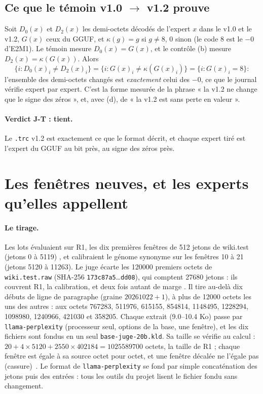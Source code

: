 \subsection{Ce que le témoin v1.0 \texorpdfstring{$\to$}{->} v1.2 prouve}\label{t3jug:sec:temoin}

Soit $D_0(x)$ et $D_2(x)$ les demi-octets décodés de l'expert $x$ dans le v1.0 et le v1.2, $G(x)$ ceux du GGUF, et $\kappa(g) = g$ si $g \ne 8$, $0$ sinon (le code 8 est le $-0$ d'E2M1). Le témoin mesure $D_0(x) = G(x)$, et le contrôle (b) mesure $D_2(x) = \kappa(G(x))$. Alors
\[
\{ i : D_0(x)_i \ne D_2(x)_i \} = \{ i : G(x)_i \ne \kappa(G(x)_i) \} = \{ i : G(x)_i = 8 \} :
\]
l'ensemble des demi-octets changés est \emph{exactement} celui des $-0$, ce que le journal vérifie expert par expert. C'est la forme mesurée de la phrase « la v1.2 ne change que le signe des zéros », et, avec (d), de « la v1.2 est sans perte en valeur ».

\paragraph{Verdict J-T : tient.} Le \texttt{.trc} v1.2 est exactement ce que le format décrit, et chaque expert tiré est l'expert du GGUF au bit près, au signe des zéros près.

\section{Les fenêtres neuves, et les experts qu'elles appellent}\label{t3jug:sec:fenetres}

\paragraph{Le tirage.} Les lots évaluaient sur R1, les dix premières fenêtres de 512 jetons de wiki.test (jetons 0 à \num{5119}) \parencite{merity2016wikitext}, et calibraient le génome synonyme sur les fenêtres 10 à 21 (jetons \num{5120} à \num{11263}). Le juge écarte les \num{120000} premiers octets de \texttt{wiki.test.raw} (SHA-256 \texttt{173c87a5}…\texttt{dd08}), qui comptent \num{27680} jetons : ils couvrent R1, la calibration, et deux fois autant de marge \mes. Il tire au-delà dix débuts de ligne de paragraphe (graine $\num{20261022} + 1$), à plus de \num{12000} octets les uns des autres : aux octets \num{767283}, \num{511976}, \num{615155}, \num{854814}, \num{1148495}, \num{1228294}, \num{1098980}, \num{1240966}, \num{421030} et \num{358205}. Chaque extrait (\numrange{9.0}{10.4} Ko) passe par \texttt{llama-perplexity} (processeur seul, options de la base, une fenêtre), et les dix fichiers sont fondus en un seul \texttt{base-juge-20b.kld}. Sa taille se vérifie au calcul : $20 + 4 \times \num{5120} + \num{2550} \times \num{402184} = \num{1025589700}$ octets, la taille de R1 ; chaque fenêtre est égale à sa source octet pour octet, et une fenêtre décalée ne l'égale pas (cassure) \mes\,\calc. Le format de \texttt{llama-perplexity} se fond par simple concaténation des jetons puis des entrées : tous les outils du projet lisent le fichier fondu sans changement.

